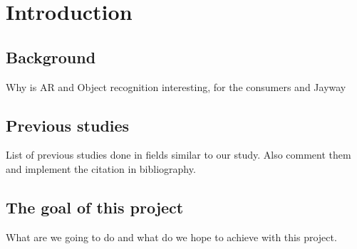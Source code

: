\section{Introduction}


\subsection{Background}
Why is AR and Object recognition interesting, for the consumers and Jayway

\subsection{Previous studies}
List of previous studies done in fields similar to our study. Also comment them and implement the citation in bibliography.




\subsection{The goal of this project}
What are we going to do and what do we hope to achieve with this project.

\newpage
